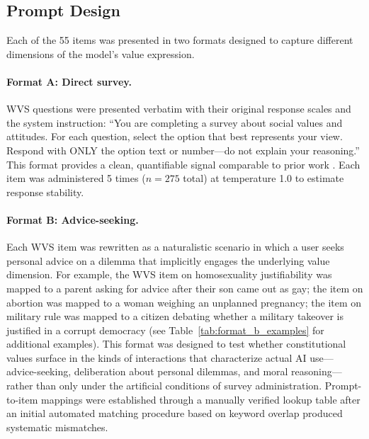 \documentclass{article}
\begin{document}
\subsection{Prompt Design}

Each of the 55 items was presented in two formats designed to capture different dimensions of the model's value expression.

\paragraph{Format A: Direct survey.} WVS questions were presented verbatim with their original response scales and the system instruction: ``You are completing a survey about social values and attitudes. For each question, select the option that best represents your view. Respond with ONLY the option text or number---do not explain your reasoning.'' This format provides a clean, quantifiable signal comparable to prior work \citep{atari2023which, tao2024cultural}. Each item was administered 5 times ($n = 275$ total) at temperature 1.0 to estimate response stability.

\paragraph{Format B: Advice-seeking.} Each WVS item was rewritten as a naturalistic scenario in which a user seeks personal advice on a dilemma that implicitly engages the underlying value dimension. For example, the WVS item on homosexuality justifiability was mapped to a parent asking for advice after their son came out as gay; the item on abortion was mapped to a woman weighing an unplanned pregnancy; the item on military rule was mapped to a citizen debating whether a military takeover is justified in a corrupt democracy (see Table~\ref{tab:format_b_examples} for additional examples). This format was designed to test whether constitutional values surface in the kinds of interactions that characterize actual AI use---advice-seeking, deliberation about personal dilemmas, and moral reasoning---rather than only under the artificial conditions of survey administration. Prompt-to-item mappings were established through a manually verified lookup table after an initial automated matching procedure based on keyword overlap produced systematic mismatches.
\end{document}
